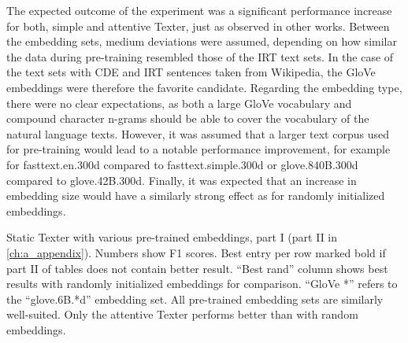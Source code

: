 The expected outcome of the experiment was a significant performance increase for both, simple and attentive Texter, just as observed in other works. Between the embedding sets, medium deviations were assumed, depending on how similar the data during pre-training resembled those of the IRT text sets. In the case of the text sets with CDE and IRT sentences taken from Wikipedia, the GloVe embeddings were therefore the favorite candidate. Regarding the embedding type, there were no clear expectations, as both a large GloVe vocabulary and compound character n-grams should be able to cover the vocabulary of the natural language texts. However, it was assumed that a larger text corpus used for pre-training would lead to a notable performance improvement, for example for fasttext.en.300d compared to fasttext.simple.300d or glove.840B.300d compared to glove.42B.300d. Finally, it was expected that an increase in embedding size would have a similarly strong effect as for randomly initialized embeddings.

\begin{table}[t]
    \makebox[\textwidth][c]{
        
    }
    \caption{Static Texter with various pre-trained embeddings, part I (part II in \autoref{ch:a_appendix}). Numbers show F1 scores. Best entry per row marked bold if part II of tables does not contain better result. ``Best rand'' column shows best results with randomly initialized embeddings for comparison. ``GloVe *'' refers to the ``glove.6B.*d'' embedding set. All pre-trained embedding sets are similarly well-suited. Only the attentive Texter performs better than with random embeddings.}
    \label{tab:5_experiments/3_texter/2_static/3_pre_trained/grid_search}
\end{table}

